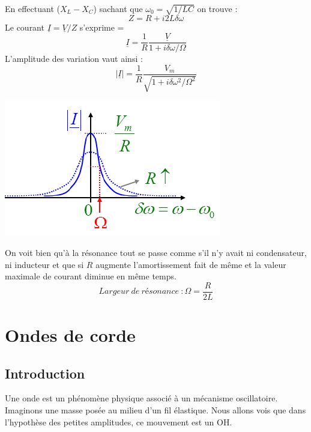 \documentclass	[11pt, a4paper, openany]{book}
\begin{document}
		En effectuant ($X_L - X_C$) sachant que $\omega_0 = \sqrt{1/LC}$ on trouve :
		\begin{equation}
			Z = R + i2L\delta\omega
		\end{equation}
		Le courant $\underline{I} = \underline{V}/Z$ s'exprime =
		\begin{equation}
			\underline{I} = \frac{1}{R}\frac{\underline{V}}{1+i\delta\omega/\Omega}
		\end{equation}
		L'amplitude des variation vaut ainsi :
		\begin{equation}
			|\underline{I}| = \frac{1}{R}\frac{V_m}{\sqrt{1+i\delta\omega^2/\Omega^2}}
		\end{equation}
		
		\begin{center}
			\includegraphics[scale=0.5]{oo/image21.png}
		\end{center}
		On voit bien qu'à la résonance tout se passe comme s'il n'y avait ni condensateur, ni inducteur et que si $R$ augmente l'amortissement fait de même et la valeur maximale de courant diminue en même temps.
		\begin{equation}
			Largeur\ de\ résonance\ : \Omega = \frac{R}{2L}
		\end{equation}
		
		\section{Ondes de corde}
		\subsection{Introduction}
		Une onde est un phénomène physique associé à un mécanisme oscillatoire. Imaginons une masse posée au milieu d'un fil élastique. Nous allons vois que dans l'hypothèse des petites amplitudes, ce mouvement est un OH.\\
		
\end{document}
